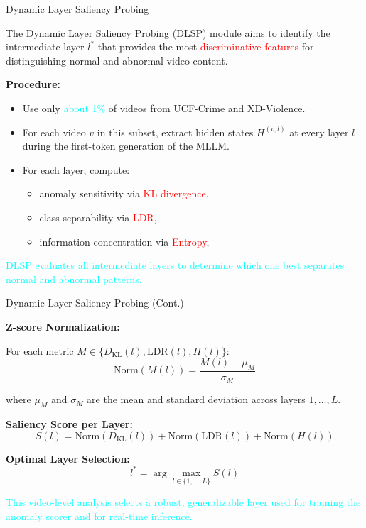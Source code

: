 \documentclass[aspectratio=169,xcolor=dvipsnames]{beamer}
\begin{document}
	
	
	\begin{frame}{Dynamic Layer Saliency Probing}
		\small
		
		The Dynamic Layer Saliency Probing (DLSP) module aims to identify the intermediate
		layer $l^{*}$ that provides the most \textcolor{red}{discriminative features} for distinguishing
		normal and abnormal video content.
		
		\vspace{1em}
		
		\textbf{Procedure:}
		\begin{itemize}
			\item Use only \textcolor{cyan}{about 1\%} of videos from UCF-Crime and XD-Violence.
			\item For each video $v$ in this subset, extract hidden states $H^{(v, l)}$ at every layer $l$
			during the first-token generation of the MLLM.
			\item For each layer, compute:
			\begin{itemize}
				\item anomaly sensitivity via \textcolor{red}{KL divergence},
				\item class separability via \textcolor{red}{LDR},
				\item information concentration via \textcolor{red}{Entropy},
			\end{itemize}
		\end{itemize}
		
		\vspace{1em}
		
		\textcolor{cyan}{DLSP evaluates all intermediate layers to determine which one best separates normal and abnormal patterns.}
		
	\end{frame}
	
	
	\begin{frame}{Dynamic Layer Saliency Probing (Cont.)}
		\small
		
		\textbf{Z-score Normalization:}
		
		For each metric $M \in \{D_{\mathrm{KL}}(l), \mathrm{LDR}(l), H(l)\}$:
		\[
		\text{Norm}(M(l)) = \frac{M(l) - \mu_M}{\sigma_M}
		\]
		
		where $\mu_M$ and $\sigma_M$ are the mean and standard deviation across layers $1,\dots,L$.
		
		\vspace{1em}
		
		\textbf{Saliency Score per Layer:}
		\[
		S(l) = 
		\text{Norm}(D_{\mathrm{KL}}(l)) +
		\text{Norm}(\mathrm{LDR}(l)) +
		\text{Norm}(H(l))
		\]
		
		\vspace{1em}
		
		\textbf{Optimal Layer Selection:}
		\[
		l^{*} = \arg\max_{l \in \{1,\dots,L\}} S(l)
		\]
		
		\vspace{1em}
		
		\textcolor{cyan}{This video-level analysis selects a robust, generalizable layer used for training the anomaly scorer and for real-time inference.}
		
	\end{frame}
	
\end{document}
